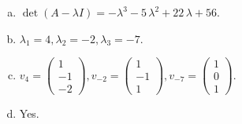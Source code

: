 \begin{questions}
\begin{solution}
\begin{enumerate}[(a)]
\item $\det(A-\lambda I)=-{\lambda}^{3} - 5 \, {\lambda}^{2} + 22 \, {\lambda} + 56$.
\item ${\lambda}_1=4, {\lambda}_2=-2, {\lambda}_3=-7$.
\item $v_{4}=\left(\begin{array}{r}
1 \\
-1 \\
-2
\end{array}\right), v_{-2}=\left(\begin{array}{r}
1 \\
-1 \\
1
\end{array}\right), v_{-7}=\left(\begin{array}{r}
1 \\
0 \\
1
\end{array}\right)$.
\item Yes.
\end{enumerate}
\end{solution}

\end{questions}

\newpage


\begin{center}
\end{center}

